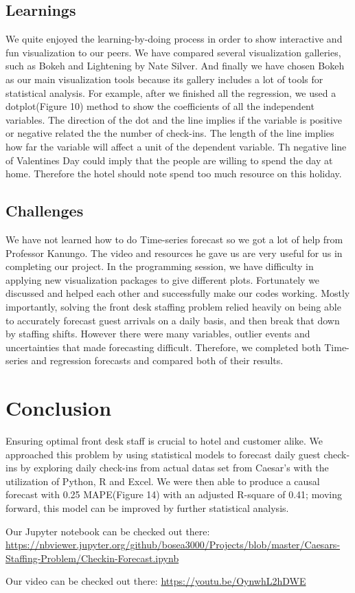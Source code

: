 \documentclass{article}
\begin{document}
\subsection{Learnings}

We quite enjoyed the learning-by-doing process in order to show interactive and fun visualization to our peers. We have compared several visualization galleries, such as Bokeh and Lightening by Nate Silver. And finally we have chosen Bokeh as our main visualization tools because its gallery includes a lot of tools for statistical analysis. For example, after we finished all the regression, we used a dotplot(Figure 10) method to show the coefficients of all the independent variables. The direction of the dot and the line implies if the variable is positive or negative related the the number of check-ins. The length of the line implies how far the variable will affect a unit of the dependent variable. Th negative line of Valentines Day could imply that the people are willing to spend the day at home. Therefore the hotel should note spend too much resource on this holiday.

\subsection{Challenges}

We have not learned how to do Time-series forecast so we got a lot of help from Professor Kanungo. The video and resources he gave us are very useful for us in completing our project. In the programming session, we have difficulty in applying new visualization packages to give different plots. Fortunately we discussed and helped each other and successfully make our codes working. Mostly importantly, solving the front desk staffing problem relied heavily on being able to accurately forecast guest arrivals on a daily basis, and then break that down by staffing shifts. However there were many variables, outlier events and uncertainties that made forecasting difficult. Therefore, we completed both Time-series and regression forecasts and compared both of their results.


\section{Conclusion}

Ensuring optimal front desk staff is crucial to hotel and customer alike. We approached this problem by using statistical models to forecast daily guest check-ins by exploring daily check-ins from actual datas set from Caesar’s with the utilization of Python, R and Excel. We were then able to produce a causal forecast with 0.25 MAPE(Figure 14) with an adjusted R-square of 0.41; moving forward, this model can be improved by further statistical analysis. 

Our Jupyter notebook can be checked out there: \url{https://nbviewer.jupyter.org/github/bosea3000/Projects/blob/master/Caesars-Staffing-Problem/Checkin-Forecast.ipynb}

Our video can be checked out there: \url{https://youtu.be/OynwhL2hDWE}
\end{document}
